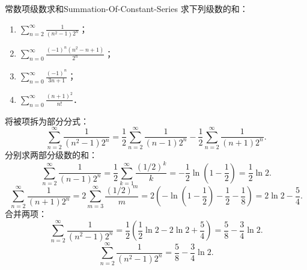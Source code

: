 \begin{problem}{常数项级数求和}{Summation-Of-Constant-Series}
    求下列级数的和：
    \begin{enumerate}
        \item $\sum_{n=2}^\infty \frac{1}{(n^2 - 1)2^n}$；
        \item $\sum_{n=0}^\infty \frac{(-1)^n(n^2 - n + 1)}{2^n}$；
        \item $\sum_{n=0}^\infty \frac{(-1)^n}{3n + 1}$；
        \item $\sum_{n=0}^\infty \frac{(n + 1)^2}{n!}$．
    \end{enumerate}
\end{problem}

\begin{solution}

    将被项拆为部分分式：
    \begin{equation}
        \sum_{n=2}^\infty \frac{1}{(n^2 - 1)2^n} = \frac{1}{2} \sum_{n=2}^\infty \frac{1}{(n-1)2^n} - \frac{1}{2} \sum_{n=2}^\infty \frac{1}{(n+1)2^n}.
    \end{equation}
    分别求两部分级数的和：
    \begin{equation}
        \sum_{n=2}^\infty \frac{1}{(n-1)2^n} = \frac{1}{2}\sum_{k=1}^\infty \frac{(1/2)^k}{k} = -\frac{1}{2}\ln\left(1 - \frac{1}{2}\right) = \frac{1}{2}\ln 2.
    \end{equation}
    \begin{equation}
        \sum_{n=2}^\infty \frac{1}{(n+1)2^n} = 2\sum_{m=3}^\infty \frac{(1/2)^m}{m} = 2\left( -\ln\left(1 - \frac{1}{2}\right) - \frac{1}{2} - \frac{1}{8} \right) = 2\ln 2 - \frac{5}{4}.
    \end{equation}
    合并两项：
    \begin{equation}
        \sum_{n=2}^\infty \frac{1}{(n^2 - 1)2^n} = \frac{1}{2}\left( \frac{1}{2}\ln 2 - 2\ln 2 + \frac{5}{4} \right) = \frac{5}{8} - \frac{3}{4}\ln 2.
    \end{equation}
    \begin{equation}
        \boxed{\sum_{n=2}^\infty \frac{1}{(n^2 - 1)2^n} = \frac{5}{8} - \frac{3}{4}\ln 2.}
    \end{equation}



\end{solution}
